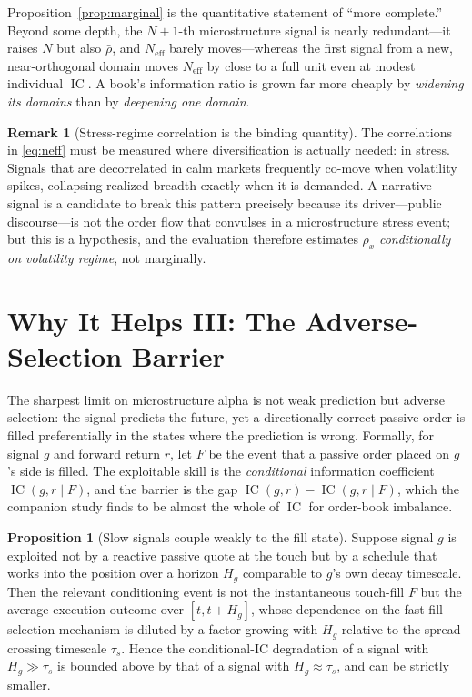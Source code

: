 \documentclass[11pt,a4paper]{article}
\theoremstyle{definition}
\newtheorem{remark}{Remark}[section]
\newtheorem{proposition}{Proposition}[section]
\theoremstyle{plain}
\DeclareMathOperator{\IC}{IC}
\begin{document}
Proposition~\ref{prop:marginal} is the quantitative statement of ``more complete.'' Beyond some depth,
the $N{+}1$-th microstructure signal is nearly redundant---it raises $N$ but also $\bar\rho$, and
$N_{\mathrm{eff}}$ barely moves---whereas the first signal from a new, near-orthogonal domain moves
$N_{\mathrm{eff}}$ by close to a full unit even at modest individual $\IC$. A book's information ratio
is grown far more cheaply by \emph{widening its domains} than by \emph{deepening one domain}.

\begin{remark}[Stress-regime correlation is the binding quantity]
\label{rem:stress}
The correlations in \eqref{eq:neff} must be measured where diversification is actually needed: in
stress. Signals that are decorrelated in calm markets frequently co-move when volatility spikes,
collapsing realized breadth exactly when it is demanded. A narrative signal is a candidate to break
this pattern precisely because its driver---public discourse---is not the order flow that convulses in
a microstructure stress event; but this is a hypothesis, and the evaluation therefore estimates
$\rho_x$ \emph{conditionally on volatility regime}, not marginally.
\end{remark}

\section{Why It Helps III: The Adverse-Selection Barrier}
\label{sec:advsel}

The sharpest limit on microstructure alpha is not weak prediction but adverse selection: the signal
predicts the future, yet a directionally-correct passive order is filled preferentially in the states
where the prediction is wrong. Formally, for signal $g$ and forward return $r$, let $F$ be the event
that a passive order placed on $g$'s side is filled. The exploitable skill is the \emph{conditional}
information coefficient $\IC(g,r\mid F)$, and the barrier is the gap
$\IC(g,r)-\IC(g,r\mid F)$, which the companion study finds to be almost the whole of $\IC$ for
order-book imbalance.

\begin{proposition}[Slow signals couple weakly to the fill state]
\label{prop:advsel}
Suppose signal $g$ is exploited not by a reactive passive quote at the touch but by a schedule that
works into the position over a horizon $H_g$ comparable to $g$'s own decay timescale. Then the
relevant conditioning event is not the instantaneous touch-fill $F$ but the average execution outcome
over $[t,t+H_g]$, whose dependence on the fast fill-selection mechanism is diluted by a factor growing
with $H_g$ relative to the spread-crossing timescale $\tau_s$. Hence the conditional-IC degradation of
a signal with $H_g\gg\tau_s$ is bounded above by that of a signal with $H_g\approx\tau_s$, and can be
strictly smaller.
\end{proposition}
\end{document}
